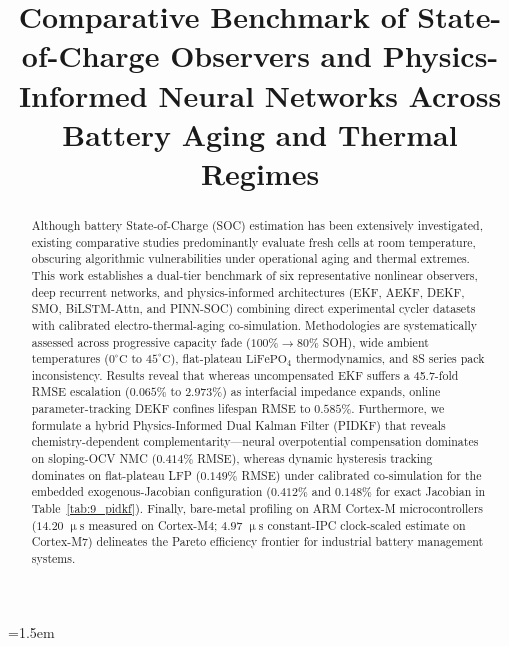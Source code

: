 \documentclass[balance,nocopyright,upint,varvw,hyphenate,barcolor=NavyBlue,nolists]{asmejour}
\begin{document}
\emergencystretch=1.5em



\title{Comparative Benchmark of State-of-Charge Observers and Physics-Informed Neural Networks Across Battery Aging and Thermal Regimes}


\begin{abstract}
Although battery State-of-Charge (SOC) estimation has been extensively investigated, existing comparative studies predominantly evaluate fresh cells at room temperature, obscuring algorithmic vulnerabilities under operational aging and thermal extremes. This work establishes a dual-tier benchmark of six representative nonlinear observers, deep recurrent networks, and physics-informed architectures (EKF, AEKF, DEKF, SMO, BiLSTM-Attn, and PINN-SOC) combining direct experimental cycler datasets with calibrated electro-thermal-aging co-simulation. Methodologies are systematically assessed across progressive capacity fade ($100\% \rightarrow 80\%$ SOH), wide ambient temperatures ($0^\circ\text{C}$ to $45^\circ\text{C}$), flat-plateau $\text{LiFePO}_4$ thermodynamics, and 8S series pack inconsistency. Results reveal that whereas uncompensated EKF suffers a 45.7-fold RMSE escalation ($0.065\%$ to $2.973\%$) as interfacial impedance expands, online parameter-tracking DEKF confines lifespan RMSE to $0.585\%$. Furthermore, we formulate a hybrid Physics-Informed Dual Kalman Filter (PIDKF) that reveals chemistry-dependent complementarity—neural overpotential compensation dominates on sloping-OCV NMC ($0.414\%$ RMSE), whereas dynamic hysteresis tracking dominates on flat-plateau LFP ($0.149\%$ RMSE) under calibrated co-simulation for the embedded exogenous-Jacobian configuration ($0.412\%$ and $0.148\%$ for exact Jacobian in Table~\ref{tab:9_pidkf}). Finally, bare-metal profiling on ARM Cortex-M microcontrollers ($14.20\;\upmu\mathrm{s}$ measured on Cortex-M4; $4.97\;\upmu\mathrm{s}$ constant-IPC clock-scaled estimate on Cortex-M7) delineates the Pareto efficiency frontier for industrial battery management systems.
\end{abstract}
\end{document}

